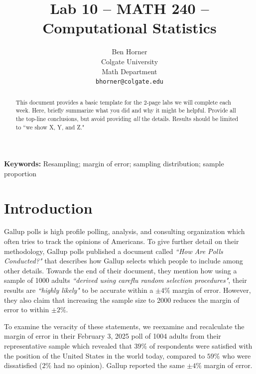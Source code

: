 \documentclass{article}\usepackage[]{graphicx}\usepackage[]{xcolor}
\begin{document}
\vspace{-1in}
\title{Lab 10 -- MATH 240 -- Computational Statistics}

\author{
  Ben Horner \\
  Colgate University  \\
  Math Department  \\
  {\tt bhorner@colgate.edu}
}

\date{}

\maketitle

\begin{multicols}{2}
\begin{abstract}
This document provides a basic template for the 2-page labs we will complete each week. Here, briefly summarize what you did and why it might be helpful. Provide all the top-line conclusions, but avoid providing \emph{all} the details. Results should be limited to ``we show X, Y, and Z."
\end{abstract}

\noindent \textbf{Keywords:} Resampling; margin of error; sampling distribution; sample proportion

\section{Introduction}
Gallup polls is high profile polling, analysis, and consulting organization which often tries to track the opinions of Americans. To give further detail on their methodology, Gallup polls published a document called \emph{``How Are Polls Conducted?"} that describes how Gallup selects which people to include among other details. Towards the end of their document, they mention how using a sample of 1000 adults \emph{``derived using careflu random selection procedures"}, their results are \emph{``highly likely"} to be accurate within a $\pm 4\%$ margin of error. However, they also claim that increasing the sample size to 2000 reduces the margin of error to within $\pm 2\%$. 

To examine the veracity of these statements, we reexamine and recalculate the margin of error in their February 3, 2025 poll of 1004 adults from their representative sample which revealed that $39\%$ of respondents were satisfied with the position of the United States in the world today, compared to $59\%$ who were dissatisfied ($2\%$ had no opinion). Gallup reported the same $\pm 4\%$ margin of error. 





\end{multicols}
\end{document}
